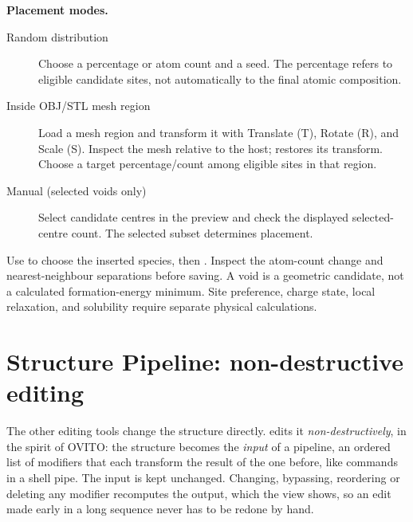 \textbf{Placement modes.}
\begin{description}
\item[Random distribution] Choose a percentage or atom count and a seed. The percentage refers to eligible candidate sites, not automatically to the final atomic composition.
\item[Inside OBJ/STL mesh region] Load a mesh region and transform it with Translate (T), Rotate (R), and Scale (S). Inspect the mesh relative to the host;  restores its transform. Choose a target percentage/count among eligible sites in that region.
\item[Manual (selected voids only)] Select candidate centres in the preview and check the displayed selected-centre count. The selected subset determines placement.
\end{description}
Use  to choose the inserted species, then . Inspect the atom-count change and nearest-neighbour separations before saving. A void is a geometric candidate, not a calculated formation-energy minimum. Site preference, charge state, local relaxation, and solubility require separate physical calculations.

\section{Structure Pipeline: non-destructive editing}\label{sec:pipeline}
The other editing tools change the structure directly.  edits it \emph{non-destructively}, in the spirit of OVITO: the structure becomes the \emph{input} of a pipeline, an ordered list of modifiers that each transform the result of the one before, like commands in a shell pipe. The input is kept unchanged. Changing, bypassing, reordering or deleting any modifier recomputes the output, which the view shows, so an edit made early in a long sequence never has to be redone by hand.

